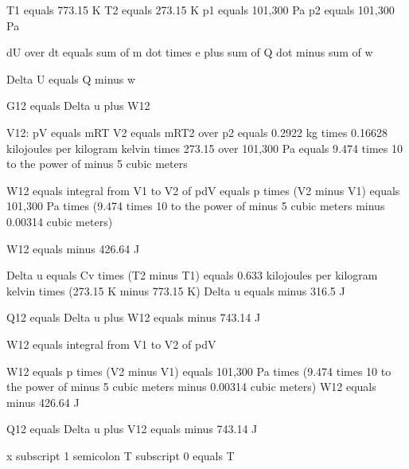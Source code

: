 T1 equals 773.15 K  
T2 equals 273.15 K  
p1 equals 101,300 Pa  
p2 equals 101,300 Pa  

dU over dt equals sum of m dot times e plus sum of Q dot minus sum of w  

Delta U equals Q minus w  

G12 equals Delta u plus W12  

V12:  
pV equals mRT  
V2 equals mRT2 over p2 equals 0.2922 kg times 0.16628 kilojoules per kilogram kelvin times 273.15 over 101,300 Pa equals 9.474 times 10 to the power of minus 5 cubic meters  

W12 equals integral from V1 to V2 of pdV equals p times (V2 minus V1) equals 101,300 Pa times (9.474 times 10 to the power of minus 5 cubic meters minus 0.00314 cubic meters)  

W12 equals minus 426.64 J  

Delta u equals Cv times (T2 minus T1) equals 0.633 kilojoules per kilogram kelvin times (273.15 K minus 773.15 K)  
Delta u equals minus 316.5 J  

Q12 equals Delta u plus W12 equals minus 743.14 J  

W12 equals integral from V1 to V2 of pdV  

W12 equals p times (V2 minus V1) equals 101,300 Pa times (9.474 times 10 to the power of minus 5 cubic meters minus 0.00314 cubic meters)  
W12 equals minus 426.64 J  

Q12 equals Delta u plus V12 equals minus 743.14 J

x subscript 1 semicolon  
T subscript 0 equals T